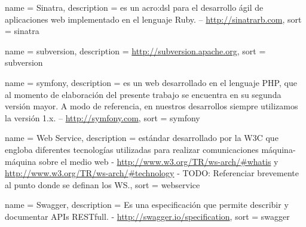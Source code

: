  {
  name = {Sinatra},
  description = {es un \gls{acro:dsl} para el desarrollo ágil de aplicaciones web implementado en el lenguaje Ruby. – \url{http://sinatrarb.com}},
  sort = {sinatra}
}

 {
  name = {subversion},
  description = {\url{http://subversion.apache.org}},
  sort = {subversion}
}

 {
  name = {symfony},
  description = {es un  web desarrollado en el lenguaje PHP, que al momento de elaboración del presente trabajo se encuentra en su segunda versión mayor. A modo de referencia, en nuestros desarrollos siempre utilizamos la versión 1.x. – \url{http://symfony.com}},
  sort = {symfony}
}

 {
  name = {Web Service},
  description = {estándar desarrollado por la W3C que engloba diferentes tecnologías utilizadas para realizar comunicaciones máquina-máquina sobre el medio web - \url{http://www.w3.org/TR/ws-arch/\#whatis} y \url{http://www.w3.org/TR/ws-arch/\#technology} - TODO: Referenciar brevemente al punto donde se definan los WS.},
  sort = {webservice}
}

 {
  name = {Swagger},
  description = {Es una especificación que permite describir y documentar APIs RESTfull. - \url{http://swagger.io/specification}},
  sort = {swagger}
}

